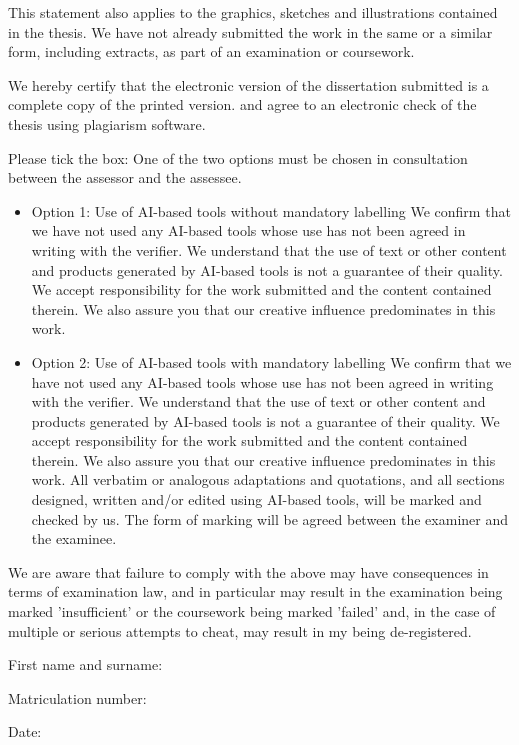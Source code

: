 \documentclass[
  11pt,
  a4paper,
  oneside]{scrbook}
\begin{document}
This statement also applies to the graphics, sketches and illustrations
contained in the thesis. We have not already submitted the work in the
same or a similar form, including extracts, as part of an examination or
coursework.

We hereby certify that the electronic version of the dissertation
submitted is a complete copy of the printed version. and agree to an
electronic check of the thesis using plagiarism software.

Please tick the box: One of the two options must be chosen in
consultation between the assessor and the assessee.

\begin{itemize}
\item[$\square$]
  Option 1: Use of AI-based tools without mandatory labelling We confirm
  that we have not used any AI-based tools whose use has not been agreed
  in writing with the verifier. We understand that the use of text or
  other content and products generated by AI-based tools is not a
  guarantee of their quality. We accept responsibility for the work
  submitted and the content contained therein. We also assure you that
  our creative influence predominates in this work.
\item[$\square$]
  Option 2: Use of AI-based tools with mandatory labelling We confirm
  that we have not used any AI-based tools whose use has not been agreed
  in writing with the verifier. We understand that the use of text or
  other content and products generated by AI-based tools is not a
  guarantee of their quality. We accept responsibility for the work
  submitted and the content contained therein. We also assure you that
  our creative influence predominates in this work. All verbatim or
  analogous adaptations and quotations, and all sections designed,
  written and/or edited using AI-based tools, will be marked and checked
  by us. The form of marking will be agreed between the examiner and the
  examinee.
\end{itemize}

We are aware that failure to comply with the above may have consequences
in terms of examination law, and in particular may result in the
examination being marked 'insufficient' or the coursework being marked
'failed' and, in the case of multiple or serious attempts to cheat, may
result in my being de-registered.

First name and surname:

Matriculation number:

Date:
\end{document}

